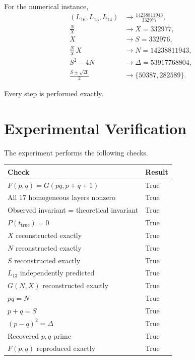 \documentclass[11pt,a4paper]{article}
\theoremstyle{definition}
\theoremstyle{remark}
\begin{document}
For the numerical instance,
\begin{align}
(L_{16},L_{15},L_{14})
&\longrightarrow
\frac{14238811943}{332977},
\\
\frac{N}{X}
&\longrightarrow
X=332977,
\\
X
&\longrightarrow
S=332976,
\\
\frac{N}{X}\,X
&\longrightarrow
N=14238811943,
\\
S^2-4N
&\longrightarrow
\Delta=53917768804,
\\
\frac{S\pm\sqrt{\Delta}}{2}
&\longrightarrow
\{50387,282589\}.
\end{align}

Every step is performed exactly.

\section{Experimental Verification}

The experiment performs the following checks.

\begin{center}
\begin{tabular}{ll}
\toprule
\textbf{Check} & \textbf{Result}\\
\midrule
$F(p,q)=G(pq,p+q+1)$ & True\\
All 17 homogeneous layers nonzero & True\\
Observed invariant = theoretical invariant & True\\
$P(t_{\mathrm{true}})=0$ & True\\
$X$ reconstructed exactly & True\\
$N$ reconstructed exactly & True\\
$S$ reconstructed exactly & True\\
$L_{13}$ independently predicted & True\\
$G(N,X)$ reconstructed exactly & True\\
$pq=N$ & True\\
$p+q=S$ & True\\
$(p-q)^2=\Delta$ & True\\
Recovered $p,q$ prime & True\\
$F(p,q)$ reproduced exactly & True\\
\bottomrule
\end{tabular}
\end{center}
\end{document}
